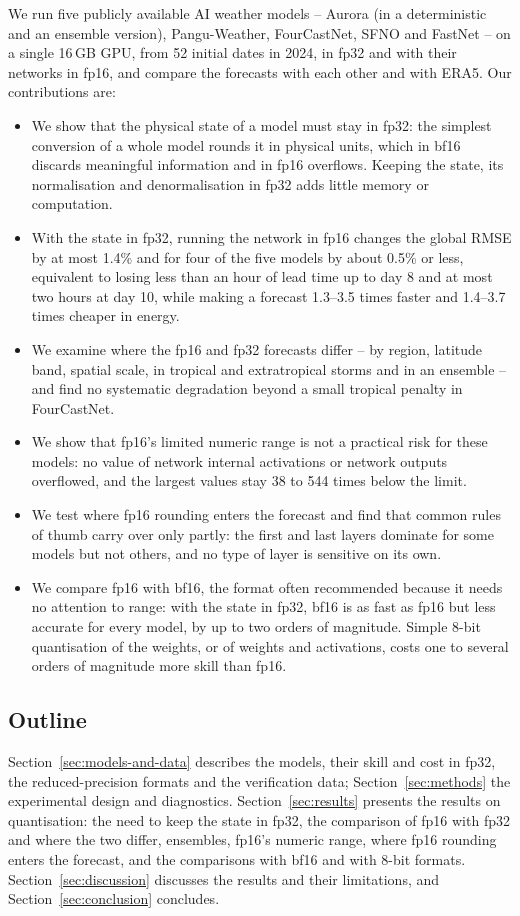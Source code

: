 We run five publicly available AI weather models -- Aurora (in a
deterministic and an ensemble version), Pangu-Weather, FourCastNet,
SFNO and FastNet -- on a single 16\,GB GPU, from 52 initial dates in
2024, in fp32 and with their networks in fp16, and compare the forecasts
with each other and with ERA5. Our contributions are:
\begin{itemize}
\item We show that the physical state of a model must stay in fp32: the
simplest conversion of a whole model rounds it in physical units, which
in bf16 discards meaningful information and in fp16 overflows. Keeping
the state, its normalisation and denormalisation in fp32 adds little
memory or computation.
\item With the state in fp32, running the network in fp16 changes the
global RMSE by at most 1.4\% and for four of the five models by about
0.5\% or less, equivalent to losing less than an hour of lead time up to
day 8 and at most two hours at day 10, while making a forecast 1.3--3.5
times faster and 1.4--3.7 times cheaper in energy.
\item We examine where the fp16 and fp32 forecasts differ -- by region,
latitude band, spatial scale, in tropical and extratropical storms and in
an ensemble -- and find no systematic degradation beyond a small
tropical penalty in FourCastNet.
\item We show that fp16's limited numeric range is not a practical risk for
these models: no value of network internal activations or network outputs
overflowed, and the largest values stay 38 to 544 times below the limit.
\item We test where fp16 rounding enters the forecast and find that
common rules of thumb carry over only partly: the first and last layers
dominate for some models but not others, and no type of layer is
sensitive on its own.
\item We compare fp16 with bf16, the format often recommended because it
needs no attention to range: with the state in fp32, bf16 is as fast as
fp16 but less accurate for every model, by up to two orders of magnitude.
Simple 8-bit quantisation of the weights, or of weights and activations,
costs one to several orders of magnitude more skill than fp16.
\end{itemize}

\subsection{Outline}
\label{sec:intro-outline}

Section~\ref{sec:models-and-data} describes the models, their
skill and cost in fp32, the reduced-precision formats and the
verification data; Section~\ref{sec:methods} the experimental design and
diagnostics. Section~\ref{sec:results} presents the results on
quantisation: the need to keep the state in fp32, the comparison of fp16
with fp32 and where the two differ, ensembles, fp16's numeric range, where fp16
rounding enters the forecast, and the comparisons with bf16 and with
8-bit formats. Section~\ref{sec:discussion}
discusses the results and their limitations, and
Section~\ref{sec:conclusion} concludes.

